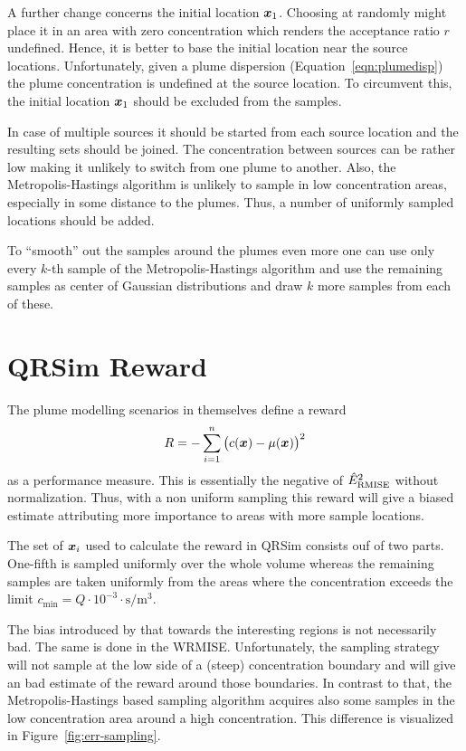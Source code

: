 A further change concerns the initial location $\bm{x}_1$. Choosing at randomly 
might place it in an area with zero concentration which renders the acceptance 
ratio $r$ undefined. Hence, it is better to base the initial location near the 
source locations. Unfortunately, given a plume dispersion 
(Equation~\ref{eqn:plumedisp}) the plume concentration is undefined at the 
source location. To circumvent this, the initial location $\bm{x}_1$ should be 
excluded from the samples.

In case of multiple sources it should be started from each source location and 
the resulting sets should be joined. The concentration between sources can be 
rather low making it unlikely to switch from one plume to another. Also, the 
Metropolis-Hastings algorithm is unlikely to sample in low concentration areas, 
especially in some distance to the plumes. Thus, a number of uniformly sampled 
locations should be added.

To ``smooth'' out the samples around the plumes even more one can use only every 
$k$-th sample of the Metropolis-Hastings algorithm and use the remaining samples 
as center of Gaussian distributions and draw $k$ more samples from each of 
these.

\section{QRSim Reward}\label{sec:qrsim-reward}
The plume modelling scenarios in \textcite{denardi2013rn} themselves define 
a reward
\begin{equation}
    R = - \sum_{i = 1}^n \del{c(\vc x) - \mu(\vc x)}^2
\end{equation}
as a performance measure. This is essentially the negative of 
$\hat{E}_{\mathrm{RMISE}}^2$ without normalization. Thus, with a non uniform sampling 
this reward will give a biased estimate attributing more importance to areas 
with more sample locations.

The set of $\bm{x}_i$ used to calculate the reward in QRSim consists ouf of two 
parts. One-fifth is sampled uniformly over the whole volume whereas the 
remaining samples are taken uniformly from the areas where the concentration 
exceeds the limit $c_{\min} = Q \cdot 10^{-3} \cdot 
\si{\second\per\meter\cubed}$.

The bias introduced by that towards the interesting regions is not necessarily 
bad. The same is done in the WRMISE\@. Unfortunately, the sampling strategy will 
not sample at the low side of a (steep) concentration boundary and will give an 
bad estimate of the reward around those boundaries. In contrast to that, the 
Metropolis-Hastings based sampling algorithm acquires also some samples in the 
low concentration area around a high concentration.  This difference is 
visualized in Figure~\ref{fig:err-sampling}.

